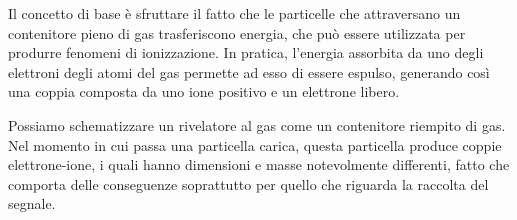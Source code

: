 Il concetto di base è sfruttare il fatto che le particelle che attraversano un contenitore pieno di gas trasferiscono energia, che può essere utilizzata per produrre fenomeni di ionizzazione. In pratica, l'energia assorbita da uno degli elettroni degli atomi del gas permette ad esso di essere espulso, generando così una coppia composta da uno ione positivo e un elettrone libero.

\begin{minipage}{0.35\textwidth}
   \begin{figure}[H]
      \centering
   \end{figure}
\end{minipage}
\begin{minipage}{0.64\textwidth}
   \vspace{0.7cm}Possiamo schematizzare un rivelatore al gas come un contenitore riempito di gas. Nel momento in cui passa una particella carica, questa particella produce coppie elettrone-ione, i quali hanno dimensioni e masse notevolmente differenti, fatto che comporta delle conseguenze soprattutto per quello che riguarda la raccolta del segnale. 
\end{minipage}

